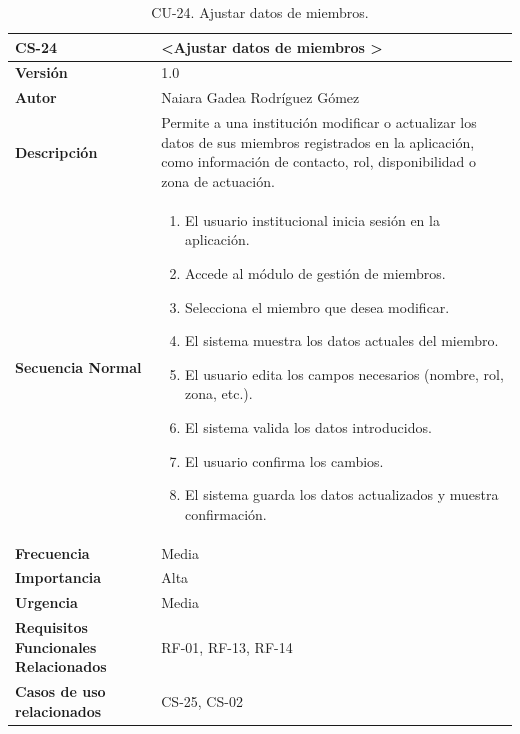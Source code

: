 \begin{table}[htbp] %
\centering
\begin{tabular}{ |m{3cm}|m{11cm}|  } 
\hline
\cellcolor[HTML]{B9E3F0}\centering\textbf{CS-24} & \cellcolor[HTML]{B9E3F0}\textbf{\textless Ajustar datos de miembros \textgreater}\\

\hline
\cellcolor[HTML]{EFEFEF}\textbf{Versión}             & 1.0  \\
\hline
\cellcolor[HTML]{EFEFEF}\textbf{Autor}                & Naiara Gadea Rodríguez Gómez\\
\hline
\cellcolor[HTML]{EFEFEF}\textbf{Descripción}                & {Permite a una institución modificar o actualizar los datos de sus miembros registrados en la aplicación, como información de contacto, rol, disponibilidad o zona de actuación.}\\
\hline
\cellcolor[HTML]{EFEFEF}\textbf{Secuencia \newline Normal}                &                 
        \begin{enumerate}
			\item El usuario institucional inicia sesión en la aplicación.
			\item Accede al módulo de gestión de miembros.
			\item Selecciona el miembro que desea modificar.
			\item El sistema muestra los datos actuales del miembro.
			\item El usuario edita los campos necesarios (nombre, rol, zona, etc.).
			\item El sistema valida los datos introducidos.
			\item El usuario confirma los cambios.
			\item El sistema guarda los datos actualizados y muestra confirmación.
		\end{enumerate}\\
\hline
\cellcolor[HTML]{EFEFEF}\textbf{Frecuencia}                & Media\\
\hline
\cellcolor[HTML]{EFEFEF}\textbf{Importancia}                & Alta\\
\hline
\cellcolor[HTML]{EFEFEF}\textbf{Urgencia}                & Media\\
\hline
\cellcolor[HTML]{EFEFEF}\textbf{Requisitos Funcionales Relacionados}                & {RF-01, RF-13, RF-14}\\
\hline
\cellcolor[HTML]{EFEFEF}\textbf{Casos de uso relacionados}                & {CS-25, CS-02}\\
\hline
\end{tabular}
\caption{CU-24. Ajustar datos de miembros.}
\end{table}

